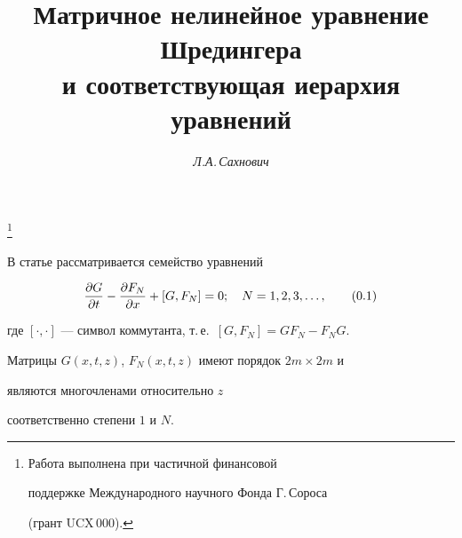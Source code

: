 



\author{\it Л.А.\,Сахнович} 




\title{Матричное нелинейное уравнение Шредингера\\ 


и соответствующая иерархия уравнений} 


 


\thanks{Работа выполнена при частичной финансовой 


поддержке Международного научного Фонда Г.\,Сороса 


(грант UCX\,000).} 


\date{} 




 


\pagestyle{plain} %


 


 




 


\maketitle 


\label{begin} 


 


В статье рассматривается семейство уравнений 


\begin{equation} 


\myfrac{G}{t}-\myfrac{F_N}{x}+[G,F_N]=0;\quad 


N=1,2,3,\dotsc,\tag{0.1} 


\end{equation} 


где $[\cdot,\cdot]$ --- символ коммутанта, т.\,е.~$[G,F_N]=GF_N-F_NG$. 


Матрицы $G(x,t,z)$, $F_N(x,t,z)$ имеют порядок $2m\times 2m$ и 


являются многочленами относительно $z$ 


соответственно степени $1$ и $N$. 


